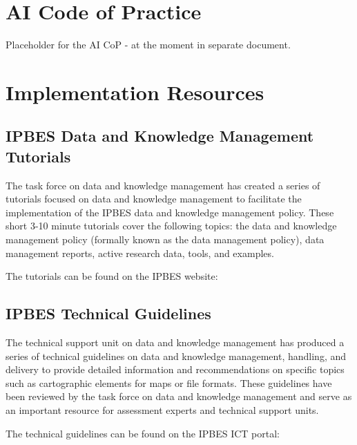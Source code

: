 \documentclass{article}
\begin{document}
\section{AI Code of Practice}
\label{sec:aicop}

Placeholder for the AI CoP - at the moment in separate document.

\section{Implementation Resources}

\subsection{IPBES Data and Knowledge Management Tutorials}

The task force on data and knowledge management has created a series of tutorials focused on data and knowledge management to facilitate the implementation of the IPBES data and knowledge management policy. These short 3-10 minute tutorials cover the following topics: the data and knowledge management policy (formally known as the data management policy), data management reports, active research data, tools, and examples.

The tutorials can be found on the IPBES website:

\subsection{IPBES Technical Guidelines}

The technical support unit on data and knowledge management has produced a series of technical guidelines on data and knowledge management, handling, and delivery to provide detailed information and recommendations on specific topics such as cartographic elements for maps or file formats. These guidelines have been reviewed by the task force on data and knowledge management and serve as an important resource for assessment experts and technical support units.

The technical guidelines can be found on the IPBES ICT portal:
\end{document}
